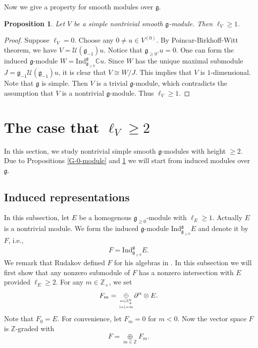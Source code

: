 \documentclass[12pt, a4paper]{amsart}
\newcommand{\fg}{\mathfrak g}
\newcommand{\C}{\mathbb{C}}
\newcommand{\Z}{\mathbb Z}
\theoremstyle{Theorem}
\theoremstyle{Theorem}
\newtheorem{proposition}[thm]{Proposition}
\numberwithin{equation}{section}
\begin{document}
Now we give a property for smooth modules over $\fg$.
\begin{proposition}\label{Property-Prop}
	Let $V$ be a simple nontrivial smooth $\fg$-module.
	Then   $\ell_{V}\ge 1$.
\end{proposition}
\begin{proof}
	Suppose $\ell_{V}=0$. Choose any $0\neq u\in V^{(0)}$. By Poincar-Birkhoff-Witt theorem,
	we have $V=\mathcal{U}(\fg_{-1})u$. Notice that $\fg_{\geq0}.u=0$. One can form the induced $\fg$-module $W=\text{Ind}_{\fg_{\geq0}}^{\fg}\C u$. Since $W$ has the unique maximal submodule
	$J=\fg_{-1}\mathcal{U}(\fg_{-1})u$, it is clear that $V\cong W/J$.
	This implies that $V$ is $1$-dimensional. Note that $\fg$ is simple. Then $V$ is a trivial $\fg$-module,
	which contradicts the assumption that $V$ is a nontrivial $\fg$-module. Thus  $\ell_{V}\geq1$.
\end{proof}

\section{The case that $\ell_{V}\geq2$}
In this section, we study   nontrivial simple smooth $\fg$-modules with height $\geq2$.
Due to  Propositions \ref{G-0-module} and \ref{Property-Prop}  we will start from   induced
modules over $\fg$.

\subsection{Induced representations}

In this subsection, let $E$ be a homogenous $\fg_{\geq0}$-module with $\ell_{E}\geq1$.
Actually $E$ is a nontrivial module. We form the induced
$\fg$-module $\text{Ind}_{\fg_{\geq0}}^{\fg}E$ and denote it by $F$, i.e.,
\begin{align} F=\text{Ind}_{\fg_{\geq0}}^{\fg}E.\end{align}
We remark that Rudakov    defined $F$ for his algebras in \cite{R}.
In this subsection we will first show that any nonzero submodule of $F$ has a nonzero intersection with $E$ provided $\ell_E\ge2$.
For any $m\in\Z_{+}$, we set
 \begin{align}\label{gradation-filtration}
 F_{m}=\underset{\alpha\in\Z_{+}^{n} \atop |\alpha|=m}{\oplus}\partial^{\alpha}\otimes E.\end{align}
Note that $F_0=E$. For convenience, let $F_{m}=0$ for $m<0$.
Now the vector space $F$ is $\Z$-graded with \[F=\underset{m\in\Z}{\oplus}F_{m}.\]
\end{document}

